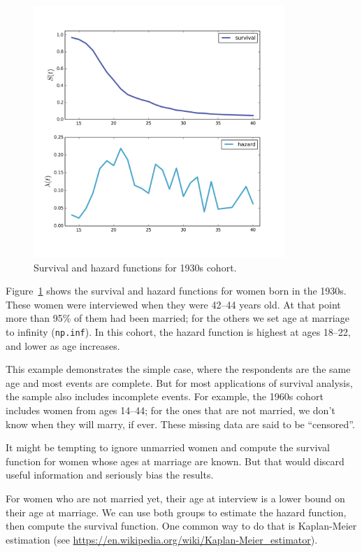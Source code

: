 \documentclass[journal]{IEEEtran}
\begin{document}
\begin{figure}[!t]
\centering
\includegraphics[width=3.75in]{marriage1}
\caption{Survival and hazard functions for 1930s cohort.}
\label{fig:marriage1}
\end{figure}

Figure~\ref{fig:marriage1} shows the survival and hazard functions
for women born in the 1930s.  These women were interviewed when they
were 42--44 years old.  At that point more than 95\% of them had been
married; for the others we set age at marriage to infinity ({\tt np.inf}).
In this cohort, the hazard function is highest at ages 18--22, and
lower as age increases.

This example demonstrates the simple case, where the respondents
are the same age and most events are complete.  But for most
applications of survival analysis, the sample also includes
incomplete events.  For example, the 1960s cohort includes women
from ages 14--44; for the ones that are not married, we don't know
when they will marry, if ever.  These missing data are said
to be ``censored''.

It might be tempting to ignore unmarried women and compute the
survival function for women whose ages at marriage are known.  But
that would discard useful information and seriously bias
the results.

For women who are not married yet, their age
at interview is a lower bound on their age at
marriage.  We can use both groups to estimate the hazard function,
then compute the survival function.  One common way to do
that is Kaplan-Meier estimation (see \url{https://en.wikipedia.org/wiki/Kaplan-Meier_estimator}).
\end{document}
